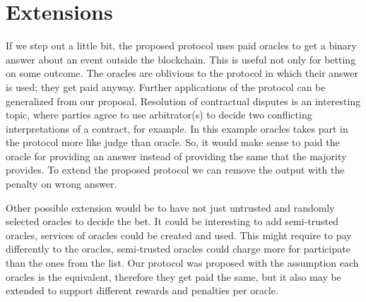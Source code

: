 \section{Extensions}

If we step out a little bit, the proposed protocol uses paid oracles to get a
  binary answer about an event outside the blockchain.
This is useful not only for betting on some outcome.
The oracles are oblivious to the protocol in which their answer is used; they
  get paid anyway.
Further applications of the protocol can be generalized from our proposal.
Resolution of contractual disputes is an interesting topic, where parties agree
  to use arbitrator(s) to decide two conflicting interpretations of a contract,
  for example.
In this example oracles takes part in the protocol more like judge than oracle.
So, it would make sense to paid the oracle for providing an answer instead of
  providing the same that the majority provides.
To extend the proposed protocol we can remove the output with the penalty on
  wrong answer.

Other possible extension would be to have not just untrusted and randomly
  selected oracles to decide the bet.
It could be interesting to add semi-trusted oracles, services of oracles could
  be created and used.
This might require to pay differently to the oracles, semi-trusted oracles could
  charge more for participate than the ones from the list.
Our protocol was proposed with the assumption each oracles is the equivalent,
  therefore they get paid the same, but it also may be extended to support
  different rewards and penalties per oracle.
